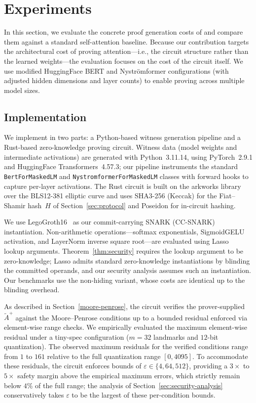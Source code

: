 \documentclass[runningheads]{llncs}
\begin{document}
\section{Experiments}
\label{sec:experiments}

In this section, we evaluate the concrete proof generation costs of \name and compare them against a standard self-attention baseline. Because our contribution targets the architectural cost of proving attention---i.e., the circuit structure rather than the learned weights---the evaluation focuses on the cost of the circuit itself. We use modified HuggingFace BERT and Nystr\"omformer configurations (with adjusted hidden dimensions and layer counts) to enable proving across multiple model sizes. 

\subsection{Implementation}
We implement \name in two parts: a Python-based witness generation pipeline and a Rust-based zero-knowledge proving circuit. Witness data (model weights and intermediate activations) are generated with Python~3.11.14, using PyTorch~2.9.1 and HuggingFace Transformers~4.57.3; our pipeline instruments the standard \texttt{BertForMaskedLM} and \texttt{NystromformerForMaskedLM} classes with forward hooks to capture per-layer activations. The Rust circuit is built on the arkworks library over the BLS12-381 elliptic curve and uses SHA3-256 (Keccak) for the Fiat--Shamir hash~$H$ of Section~\ref{sec:protocol} and Poseidon for in-circuit hashing.

We use LegoGroth16~\cite{Legosnark} as our commit-carrying SNARK (CC-SNARK) instantiation.  Non-arithmetic operations---softmax exponentials, SigmoidGELU activation, and LayerNorm inverse square root---are evaluated using Lasso~\cite{Lasso} lookup arguments. Theorem~\ref{thm:security} requires the lookup argument to be zero-knowledge; Lasso admits standard zero-knowledge instantiations by blinding the committed operands, and our security analysis assumes such an instantiation. Our benchmarks use the non-hiding variant, whose costs are identical up to the blinding overhead.

\label{subsec:pseudoinverse}
As described in Section~\ref{moore-penrose}, the circuit verifies the prover-supplied $\tilde{A}^{+}$ against the Moore--Penrose conditions up to a bounded residual enforced via element-wise range checks.
We empirically evaluated the maximum element-wise residual under a tiny-spec configuration ($m{=}32$ landmarks and $12$-bit quantization).
The observed maximum residuals for the verified conditions range from $1$ to $161$ relative to the full quantization range $[0, 4095]$.
To accommodate these residuals, the circuit enforces bounds of $\varepsilon \in \{4, 64, 512\}$, providing a $3\times$ to $5\times$ safety margin above the empirical maximum errors, which strictly remain below $4\%$ of the full range; the analysis of Section~\ref{sec:security-analysis} conservatively takes $\varepsilon$ to be the largest of these per-condition bounds.
\end{document}
